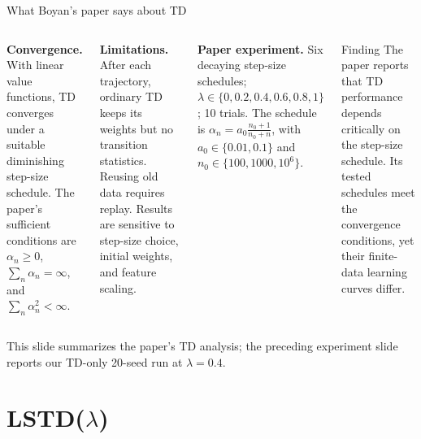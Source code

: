 \documentclass[aspectratio=169,11pt]{beamer}
\newcommand{\memberB}{Member B}
\newcommand{\speaker}[1]{} %
\begin{document}
\begin{frame}[noframenumbering]{What Boyan's paper says about TD}
  \speaker{\memberB}
  \small
  \begin{columns}[T]
    \textbf{Convergence.} With linear value functions, TD converges under a suitable diminishing step-size schedule. The paper's sufficient conditions are $\alpha_n\geq0$, $\sum_n\alpha_n=\infty$, and $\sum_n\alpha_n^2<\infty$.

    \vspace{0.5em}
    \textbf{Limitations.} After each trajectory, ordinary TD keeps its weights but no transition statistics. Reusing old data requires replay. Results are sensitive to step-size choice, initial weights, and feature scaling.

    \textbf{Paper experiment.} Six decaying step-size schedules; $\lambda\in\{0,0.2,0.4,0.6,0.8,1\}$; 10 trials. The schedule is $\alpha_n=a_0\frac{n_0+1}{n_0+n}$, with $a_0\in\{0.01,0.1\}$ and $n_0\in\{100,1000,10^6\}$.

    \vspace{0.5em}
    \begin{block}{Finding}
      The paper reports that TD performance depends critically on the step-size schedule. Its tested schedules meet the convergence conditions, yet their finite-data learning curves differ.
    \end{block}
  \end{columns}
  \vspace{0.2em}
  \scriptsize This slide summarizes the paper's TD analysis; the preceding experiment slide reports our TD-only 20-seed run at $\lambda=0.4$.
\end{frame}

\section{LSTD($\lambda$)}
\end{document}
